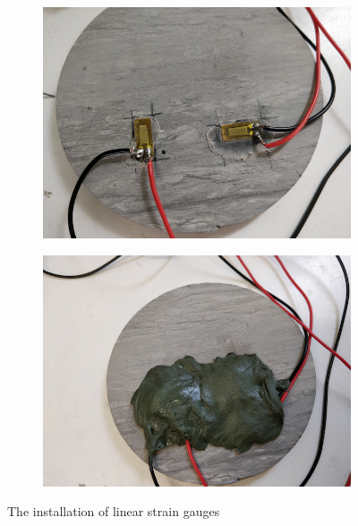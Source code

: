 \begin{figure}[!ht]
\begin{subfigure}[c]{0.48\textwidth}
\includegraphics[width=1\textwidth]{figures/Amir_ME6_Sensors.png}
\label{fig: Amir_ME6_Sensors}
\end{subfigure}
\hfill
\begin{subfigure}[c]{0.48\textwidth}
\includegraphics[width=1\textwidth]{figures/Amir_ME6_Sensors_Final.png}
\label{fig:Amir_ME6_Sensors_Final}
\end{subfigure}
\caption{The installation of linear strain gauges}
\end{figure}

